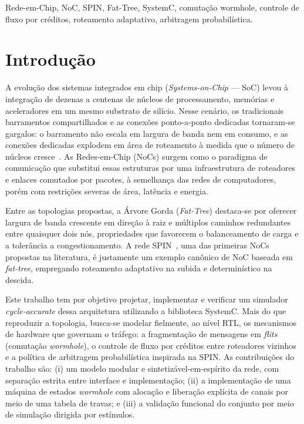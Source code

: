 \documentclass[conference]{IEEEtran}
\begin{document}
\begin{IEEEkeywords}
Rede-em-Chip, NoC, SPIN, Fat-Tree, SystemC, comutação wormhole, controle de
fluxo por créditos, roteamento adaptativo, arbitragem probabilística.
\end{IEEEkeywords}

\section{Introdução}

A evolução dos sistemas integrados em chip (\emph{Systems-on-Chip} --- SoC) levou
à integração de dezenas a centenas de núcleos de processamento, memórias e
aceleradores em um mesmo substrato de silício. Nesse cenário, os tradicionais
barramentos compartilhados e as conexões ponto-a-ponto dedicadas tornaram-se
gargalos: o barramento não escala em largura de banda nem em consumo, e as
conexões dedicadas explodem em área de roteamento à medida que o número de
núcleos cresce~\cite{benini2002networks}. As Redes-em-Chip (NoCs) surgem como o
paradigma de comunicação que substitui essas estruturas por uma infraestrutura
de roteadores e enlaces comutados por pacotes, à semelhança das redes de
computadores, porém com restrições severas de área, latência e energia.

Entre as topologias propostas, a Árvore Gorda (\emph{Fat-Tree}) destaca-se por
oferecer largura de banda crescente em direção à raiz e múltiplos caminhos
redundantes entre quaisquer dois nós, propriedades que favorecem o balanceamento
de carga e a tolerância a congestionamento. A rede SPIN~\cite{guerrier2000spin},
uma das primeiras NoCs propostas na literatura, é justamente um exemplo canônico
de NoC baseada em \emph{fat-tree}, empregando roteamento adaptativo na subida e
determinístico na descida.

Este trabalho tem por objetivo projetar, implementar e verificar um simulador
\emph{cycle-accurate} dessa arquitetura utilizando a biblioteca SystemC. Mais do
que reproduzir a topologia, busca-se modelar fielmente, ao nível RTL, os
mecanismos de hardware que governam o tráfego: a fragmentação de mensagens em
\emph{flits} (comutação \emph{wormhole}), o controle de fluxo por créditos entre
roteadores vizinhos e a política de arbitragem probabilística inspirada na SPIN.
As contribuições do trabalho são: (i) um modelo modular e sintetizável-em-espírito
da rede, com separação estrita entre interface e implementação; (ii) a
implementação de uma máquina de estados \emph{wormhole} com alocação e liberação
explícita de canais por meio de uma tabela de travas; e (iii) a validação
funcional do conjunto por meio de simulação dirigida por estímulos.
\end{document}
